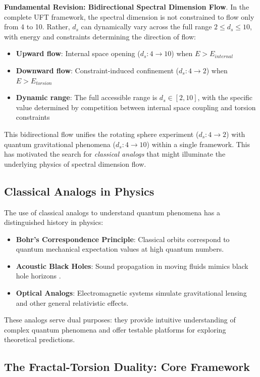 \documentclass[12pt,a4paper]{article}
\begin{document}
\textbf{Fundamental Revision: Bidirectional Spectral Dimension Flow}. In the complete UFT framework, the spectral dimension is not constrained to flow only from 4 to 10. Rather, $d_s$ can dynamically vary across the full range \textbf{$2 \leq d_s \leq 10$}, with energy and constraints determining the direction of flow:
\begin{itemize}
    \item \textbf{Upward flow}: Internal space opening ($d_s: 4 \to 10$) when $E > E_{internal}$
    \item \textbf{Downward flow}: Constraint-induced confinement ($d_s: 4 \to 2$) when $E > E_{torsion}$
    \item \textbf{Dynamic range}: The full accessible range is $d_s \in [2, 10]$, with the specific value determined by competition between internal space coupling and torsion constraints
\end{itemize}

This bidirectional flow unifies the rotating sphere experiment ($d_s: 4 \to 2$) with quantum gravitational phenomena ($d_s: 4 \to 10$) within a single framework. This has motivated the search for \textit{classical analogs} that might illuminate the underlying physics of spectral dimension flow.

\subsection{Classical Analogs in Physics}

The use of classical analogs to understand quantum phenomena has a distinguished history in physics:

\begin{itemize}
    \item \textbf{Bohr's Correspondence Principle}: Classical orbits correspond to quantum mechanical expectation values at high quantum numbers.
    \item \textbf{Acoustic Black Holes}: Sound propagation in moving fluids mimics black hole horizons \cite{unruh1981}.
    \item \textbf{Optical Analogs}: Electromagnetic systems simulate gravitational lensing and other general relativistic effects.
\end{itemize}

These analogs serve dual purposes: they provide intuitive understanding of complex quantum phenomena and offer testable platforms for exploring theoretical predictions.

\subsection{The Fractal-Torsion Duality: Core Framework}
\end{document}
